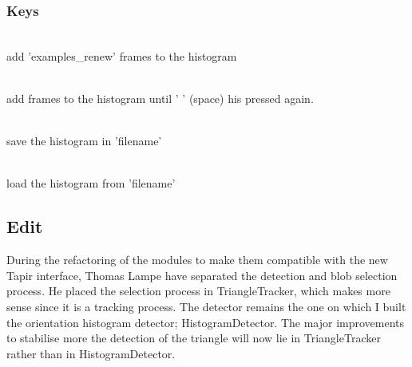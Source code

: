\subsubsection{Keys}
\label{sec:ohd:howto:keys}
    \begin{description} \itemindent=-15pt
        \item['+'] \hfill \\ add 'examples\_renew' frames to the histogram
        \item[' ' (space)] \hfill \\ add frames to the histogram until ' ' (space) his pressed again.
        \item['s'] \hfill \\ save the histogram in 'filename'
        \item['l'] \hfill \\ load the histogram from 'filename' 
    \end{description}

\subsection{Edit}
\label{sec:ohd:edit}
During the refactoring of the modules to make them compatible with the 
new Tapir interface, Thomas Lampe have separated the detection and blob 
selection process. He placed the selection process in TriangleTracker, 
which makes more sense since it is a tracking process. The detector 
remains the one on which I built the orientation histogram detector; 
HistogramDetector. The major improvements to stabilise more the detection 
of the triangle will now lie in TriangleTracker rather than in 
HistogramDetector.
